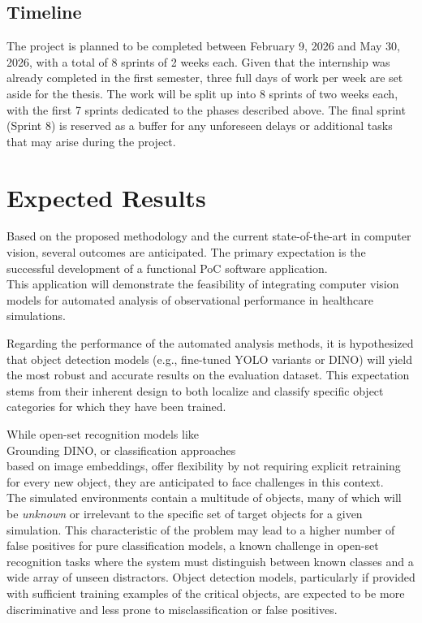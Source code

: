 \documentclass[english]{hogent-article}
\begin{document}
\subsection{Timeline}

The project is planned to be completed between February 9, 2026 and May 30, 2026, with a total of 8 sprints of 2 weeks each.
Given that the internship was already completed in the first semester, three full days of work per week are set aside for the thesis.
The work will be split up into 8 sprints of two weeks each, with the first 7 sprints dedicated to the phases described above.
The final sprint (Sprint 8) is reserved as a buffer for any unforeseen delays or additional tasks that may arise during the project.

\section{Expected Results}
\label{sec:expected-results}

Based on the proposed methodology and the current state-of-the-art in computer vision, several outcomes are anticipated.
The primary expectation is the successful development of a functional PoC software application.\\
This application will demonstrate the feasibility of integrating computer vision models for automated analysis of observational performance in healthcare simulations.

Regarding the performance of the automated analysis methods, it is hypothesized that object detection models (e.g., fine-tuned YOLO variants or DINO) will yield the most robust and accurate results on the evaluation dataset.
This expectation stems from their inherent design to both localize and classify specific object categories for which they have been trained.

While open-set recognition models like\\ Grounding DINO, or classification approaches\\ based on image embeddings, offer flexibility by not requiring explicit retraining for every new object, they are anticipated to face challenges in this context.\\
The simulated environments contain a multitude of objects, many of which will be \textit{unknown} or irrelevant to the specific set of target objects for a given simulation.
This characteristic of the problem may lead to a higher number of false positives for pure classification models, a known challenge in open-set recognition tasks where the system must distinguish between known classes and a wide array of unseen distractors.
Object detection models, particularly if provided with sufficient training examples of the critical objects, are expected to be more discriminative and less prone to misclassification or false positives.
\end{document}
